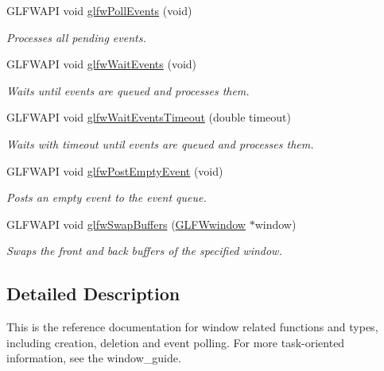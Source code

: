\begin{CompactItemize}
GLFWAPI void \hyperlink{group__window_g872d16e4c77f58c0436f356255920cfc}{glfwPollEvents} (void)
\begin{CompactList}\small\item\em Processes all pending events. \item\end{CompactList}\item 
GLFWAPI void \hyperlink{group__window_g6e042d05823c11e11c7339b81a237738}{glfwWaitEvents} (void)
\begin{CompactList}\small\item\em Waits until events are queued and processes them. \item\end{CompactList}\item 
GLFWAPI void \hyperlink{group__window_g05223a0a4c5e50f10f289e60398153aa}{glfwWaitEventsTimeout} (double timeout)
\begin{CompactList}\small\item\em Waits with timeout until events are queued and processes them. \item\end{CompactList}\item 
GLFWAPI void \hyperlink{group__window_gd6f6b997278c91c43b35970eb9713d7e}{glfwPostEmptyEvent} (void)
\begin{CompactList}\small\item\em Posts an empty event to the event queue. \item\end{CompactList}\item 
GLFWAPI void \hyperlink{group__window_gfb827800eedbfcbc97b1e5408df668d7}{glfwSwapBuffers} (\hyperlink{group__window_g3c96d80d363e67d13a41b5d1821f3242}{GLFWwindow} $\ast$window)
\begin{CompactList}\small\item\em Swaps the front and back buffers of the specified window. \item\end{CompactList}\end{CompactItemize}


\subsection{Detailed Description}
This is the reference documentation for window related functions and types, including creation, deletion and event polling. For more task-oriented information, see the window\_\-guide. 

